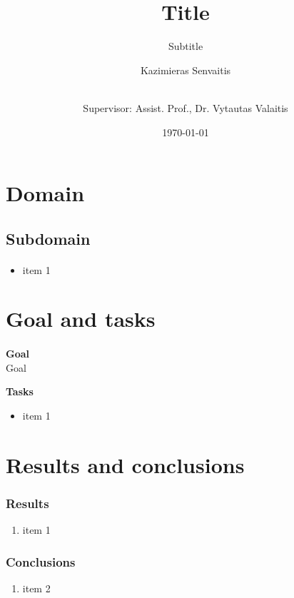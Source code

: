 \documentclass{beamer}
\title{Title}
\subtitle{Subtitle}
\author[shortname]{Kazimieras Senvaitis \and \\ Supervisor: Assist. Prof., Dr. Vytautas Valaitis}
\date{\today}
\begin{document}
	
\maketitle


\section{Domain}

\subsection{Subdomain}
\begin{frame}{\insertsection}
\framesubtitle{\insertsubsection}
\begin{itemize}
	\item item 1
\end{itemize}
\end{frame}


\section{Goal and tasks}
\begin{frame}{\insertsection}
	\framesubtitle{\insertsubsection}
	\textbf{Goal}\\
	
	Goal
	
	\textbf{Tasks}
	\begin{itemize}
		\item item 1
	\end{itemize}
\end{frame}



\section{Results and conclusions}

\begin{frame}
	\frametitle{Results}
	\begin{enumerate}
		\item item 1
	\end{enumerate}
\end{frame}

\begin{frame}
	\frametitle{Conclusions}
	\begin{enumerate}
		\item item 2
	\end{enumerate}
\end{frame}
\end{document}

